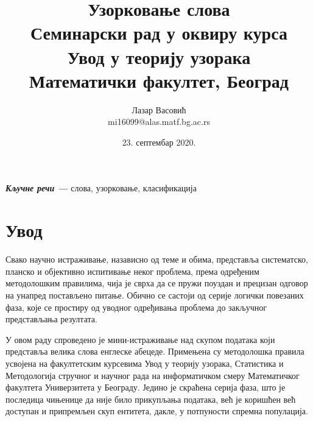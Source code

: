 \documentclass[a4paper]{article}
\makeatletter
\newcommand{\dvareda}[2][c]{\begin{tabular}[#1]{@{}c@{}}#2\end{tabular}}
\newcommand{\autor}[2]{\author{\dvareda{#1\\\normalsize{#2}}\medskip}}
\providecommand{\keywords}[1]
{
	\small	
	\textbf{\textit{Кључне речи ---}} #1
}
\makeatother
\begin{document}
\title{Узорковање слова\\ \small{Семинарски рад у оквиру курса\\Увод у теорију узорака\\Математички факултет, Београд}}

\autor{Лазар Васовић}{mi16099@alas.matf.bg.ac.rs}

\date{23. септембар 2020.}

\maketitle


\keywords{слова, узорковање, класификација}

\tableofcontents

\newpage

\section{Увод}

Свако научно истраживање, назависно од теме и обима, представља систематско, планско и објективно испитивање неког проблема, према одређеним методолошким правилима, чија је сврха да се пружи поуздан и прецизан одговор на унапред постављено питање. Обично се састоји од серије логички повезаних фаза, које се простиру од уводног одређивања проблема до закључног представљања резултата.\cite{prez1}

У овом раду спроведено је мини-истраживање над скупом података који представља велика слова енглеске абецеде. Примењена су методолошка правила усвојена на факултетским курсевима Увод у теорију узорака, Статистика и Методологија стручног и научног рада на информатичком смеру Математичког факултета Универзитета у Београду. Једино је скраћена серија фаза, што је последица чињенице да није било прикупљања података, већ је коришћен већ доступан и припремљен скуп ентитета, дакле, у потпуности спремна популација.
\end{document}
